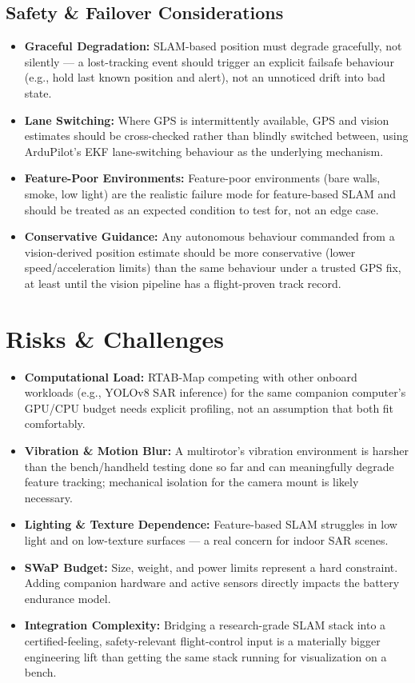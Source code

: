 \documentclass[11pt,a4paper]{article}
\begin{document}
\subsection{Safety \& Failover Considerations}
\begin{itemize}
    \item \textbf{Graceful Degradation:} SLAM-based position must degrade gracefully, not silently --- a lost-tracking event should trigger an explicit failsafe behaviour (e.g., hold last known position and alert), not an unnoticed drift into bad state.
    \item \textbf{Lane Switching:} Where GPS is intermittently available, GPS and vision estimates should be cross-checked rather than blindly switched between, using ArduPilot's EKF lane-switching behaviour as the underlying mechanism.
    \item \textbf{Feature-Poor Environments:} Feature-poor environments (bare walls, smoke, low light) are the realistic failure mode for feature-based SLAM and should be treated as an expected condition to test for, not an edge case.
    \item \textbf{Conservative Guidance:} Any autonomous behaviour commanded from a vision-derived position estimate should be more conservative (lower speed/acceleration limits) than the same behaviour under a trusted GPS fix, at least until the vision pipeline has a flight-proven track record.
\end{itemize}

\section{Risks \& Challenges}
\begin{itemize}
    \item \textbf{Computational Load:} RTAB-Map competing with other onboard workloads (e.g., YOLOv8 SAR inference) for the same companion computer's GPU/CPU budget needs explicit profiling, not an assumption that both fit comfortably.
    \item \textbf{Vibration \& Motion Blur:} A multirotor's vibration environment is harsher than the bench/handheld testing done so far and can meaningfully degrade feature tracking; mechanical isolation for the camera mount is likely necessary.
    \item \textbf{Lighting \& Texture Dependence:} Feature-based SLAM struggles in low light and on low-texture surfaces --- a real concern for indoor SAR scenes.
    \item \textbf{SWaP Budget:} Size, weight, and power limits represent a hard constraint. Adding companion hardware and active sensors directly impacts the battery endurance model.
    \item \textbf{Integration Complexity:} Bridging a research-grade SLAM stack into a certified-feeling, safety-relevant flight-control input is a materially bigger engineering lift than getting the same stack running for visualization on a bench.
\end{itemize}
\end{document}

